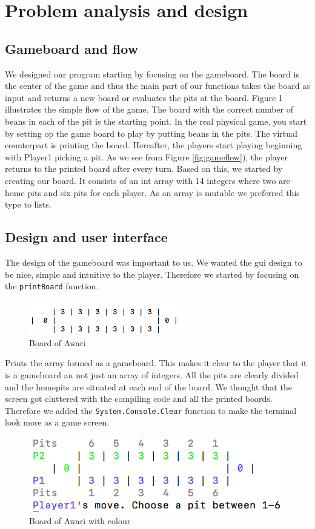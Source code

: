 \documentclass[a4paper]{report}
\begin{document}
\section*{Problem analysis and design}
\subsection*{Gameboard and flow}
We designed our program starting by focusing on the gameboard. The board is
the center of the game and thus the main part of our functions takes the board 
as input and returns a new board or evaluates the pits at the board. Figure 1 
illustrates the simple flow of the game. The board with the correct number of beans in each of the pit is the starting point. In the real physical game, you start by setting op the game board to play by putting beans in the pits. The virtual counterpart is printing the board. Hereafter, the players start playing beginning with Player1 picking a pit. As we see from Figure
\ref{fig:gameflow}), the player returns to the printed board after every turn. Based on this, we started by creating our board. It consists of an int array with 14 
integers where two are home pits and six pits for each player. As an array 
is mutable we preferred this type to lists. 

\subsection*{Design and user interface}
The design of the gameboard was important to us. We wanted the gui design to be nice, simple and intuitive to the player. Therefore we started by focusing on the 
\texttt{printBoard} function. 

\begin{figure}
\centering
\includegraphics[width=0.60\textwidth]{board1}
\caption{Board of Awari}
\end{figure}
Prints the array formed as a gameboard. This makes it clear to the player that it is a gameboard an not just an array of integers. All the pits are clearly divided and the homepits are situated at each end of the board. We thought that the screen got cluttered with the compiling code and all the printed boards. Therefore we added the \texttt{System.Console.Clear} function to make the terminal look more as a game screen.
\newline
\begin{figure}
\centering
\includegraphics{boardcolor}
\caption{Board of Awari with colour}
\end{figure}
 
\end{document}
